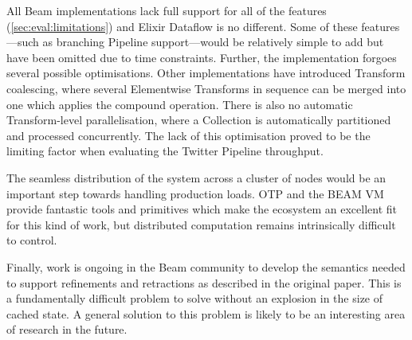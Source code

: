 All Beam implementations lack full support for all of the features (\cref{sec:eval:limitations}) and Elixir Dataflow is no different.
Some of these features---such as branching Pipeline support---would be relatively simple to add but have been omitted due to time constraints.
Further, the implementation forgoes several possible optimisations.
Other implementations have introduced Transform coalescing, where several Elementwise Transforms in sequence can be merged into one which applies the compound operation.
There is also no automatic Transform-level parallelisation, where a Collection is automatically partitioned and processed concurrently.
The lack of this optimisation proved to be the limiting factor when evaluating the Twitter Pipeline throughput.

The seamless distribution of the system across a cluster of nodes would be an important step towards handling production loads.
OTP and the BEAM VM provide fantastic tools and primitives which make the ecosystem an excellent fit for this kind of work, but distributed computation remains intrinsically difficult to control.

Finally, work is ongoing in the Beam community \cite{JIRA-retractions} to develop the semantics needed to support refinements and retractions as described in the original paper.
This is a fundamentally difficult problem to solve without an explosion in the size of cached state.
A general solution to this problem is likely to be an interesting area of research in the future.